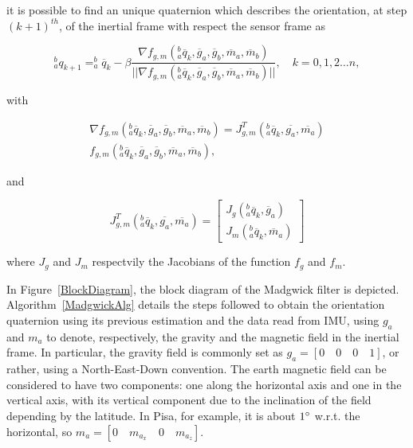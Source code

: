 \noindent it is possible to find an unique quaternion which describes the orientation, at step $(k+1)^{th}$, of the inertial frame with respect the sensor frame as

\begin{equation}
\label{eq4_15}
^b_a q_{k+1} = ^b_a \overline{q}_k - \beta \frac{\nabla f_{g,m}(^b_a \overline{q}_k,\overline{g}_a,\overline{g}_b,\overline{m}_a,\overline{m}_b) }{\vert \vert \nabla f_{g,m}(^b_a \overline{q}_k,\overline{g}_a,\overline{g}_b,\overline{m}_a,\overline{m}_b)  \vert \vert}, \quad k = 0,1,2 \dots n,
\end{equation}

\noindent with

\begin{equation}
\begin{split}
\label{eq4_16}
\nabla f_{g,m}(^b_a \overline{q}_k,\overline{g}_a,\overline{g}_b,\overline{m}_a,\overline{m}_b) = J_{g,m}^T(^b_a \overline{q}_k, \overline{g_a},\overline{m_a}) \\ {f}_{g,m}(^b_a \overline{q}_k,\overline{g}_a,\overline{g}_b,\overline{m}_a,\overline{m}_b),
\end{split}
\end{equation}

\noindent and

\begin{equation}
\label{eq4_17}
J_{g,m}^T(^b_a \overline{q}_k, \overline{g_a}, \overline{m_a}) = \left [ \begin{array}{c} J_g(^b_a \overline{q}_k,\overline{g}_a) \\ J_m(^b_a \overline{q}_k, \overline{m}_a) \end{array} \right ]
\end{equation}

\noindent where $J_g$ and $J_m$ respectvily the Jacobians of the function $f_g$ and $f_m$.

In Figure~\ref{BlockDiagram}, the block diagram of the Madgwick filter is depicted. Algorithm~\ref{MadgwickAlg} details the steps followed to obtain the orientation quaternion using its previous estimation and the data read from IMU, using $g_a$ and $m_a$ to denote, respectively, the gravity and the magnetic field in the inertial frame. In particular, the gravity field is commonly set as $g_a = [0 \quad 0 \quad 0 \quad 1]$, or rather, using a North-East-Down convention. The earth magnetic field can be considered to have two components: one along the horizontal axis and one in the vertical axis, with its vertical component due to the inclination of the field depending by the latitude. In Pisa, for example, it is about $1\degree$ w.r.t. the horizontal, so $m_a = [0 \quad m_{a_x} \quad 0 \quad m_{a_z}]$.

